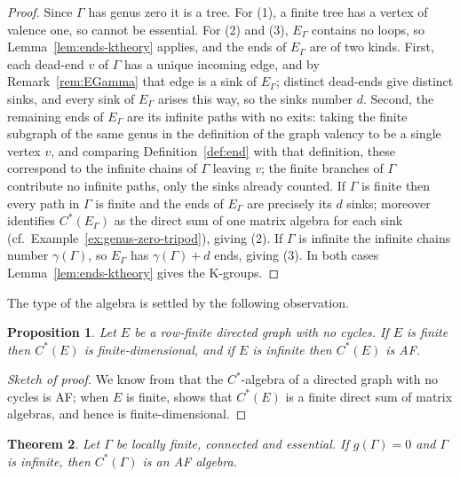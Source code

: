 \documentclass[12pt,reqno]{amsart}
\theoremstyle{plain}
\newtheorem{theorem}{Theorem}[section]
\newtheorem{proposition}[theorem]{Proposition}
\theoremstyle{definition}
\begin{document}
\begin{proof}
Since $\Gamma$ has genus zero it is a tree. For (1), a finite tree has a vertex of valence one, so
cannot be essential. For (2) and (3), $E_\Gamma$ contains no loops, so
Lemma~\ref{lem:ends-ktheory} applies, and the ends of $E_\Gamma$ are of two kinds. First, each
dead-end $v$ of $\Gamma$ has a unique incoming edge, and by Remark~\ref{rem:EGamma} that edge is a
sink of $E_\Gamma$; distinct dead-ends give distinct sinks, and every sink of $E_\Gamma$ arises
this way, so the sinks number $d$. Second, the remaining ends of $E_\Gamma$ are its infinite paths
with no exits: taking the finite subgraph of the same genus in the definition of the graph valency to be a single vertex $v$, and comparing Definition~\ref{def:end} with that definition,
these correspond to the infinite chains of $\Gamma$ leaving $v$; the finite branches of $\Gamma$
contribute no infinite paths, only the sinks already counted. If $\Gamma$ is finite then every
path in $\Gamma$ is finite and the ends of $E_\Gamma$ are precisely its $d$ sinks; moreover
\cite[Corollary~2.3]{KPR} identifies $C^*(E_\Gamma)$ as the direct sum of one matrix algebra for
each sink \textup(cf.\ Example~\ref{ex:genus-zero-tripod}\textup), giving (2). If
$\Gamma$ is infinite the infinite chains number $\gamma(\Gamma)$, so $E_\Gamma$ has
$\gamma(\Gamma)+d$ ends, giving (3). In both cases Lemma~\ref{lem:ends-ktheory} gives the
K-groups.
\end{proof}

The type of the algebra is settled by the following observation.

\begin{proposition}\label{prop:AF}
Let $E$ be a row-finite directed graph with no cycles. If $E$ is finite then $C^*(E)$ is
finite-dimensional, and if $E$ is infinite then $C^*(E)$ is AF.
\end{proposition}

\begin{proof}[Sketch of proof]
We know from \cite[Theorem~2.4]{KPR} that the $C^*$-algebra of a directed graph with no cycles is
AF; when $E$ is finite, \cite[Corollary~2.3]{KPR} shows that $C^*(E)$ is a finite direct sum of
matrix algebras, and hence is finite-dimensional.
\end{proof}

\begin{theorem}\label{thm:genus0}
Let $\Gamma$ be locally finite, connected and essential. If $g(\Gamma)=0$ and $\Gamma$ is
infinite, then $C^*(\Gamma)$ is an AF algebra.
\end{theorem}
\end{document}
